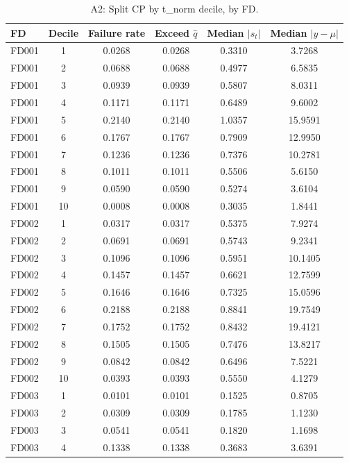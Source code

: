 \begin{table}[t]
\caption{A2: Split CP by t\_norm decile, by FD.}
\label{tab:A2-final}
\centering
\small
\begin{tabular}{lccccc}
\toprule
FD & Decile & Failure rate & Exceed $\hat q$ & Median $|s_t|$ & Median $|y-\mu|$ \\
\midrule
FD001 & 1 & 0.0268 & 0.0268 & 0.3310 & 3.7268 \\
FD001 & 2 & 0.0688 & 0.0688 & 0.4977 & 6.5835 \\
FD001 & 3 & 0.0939 & 0.0939 & 0.5807 & 8.0311 \\
FD001 & 4 & 0.1171 & 0.1171 & 0.6489 & 9.6002 \\
FD001 & 5 & 0.2140 & 0.2140 & 1.0357 & 15.9591 \\
FD001 & 6 & 0.1767 & 0.1767 & 0.7909 & 12.9950 \\
FD001 & 7 & 0.1236 & 0.1236 & 0.7376 & 10.2781 \\
FD001 & 8 & 0.1011 & 0.1011 & 0.5506 & 5.6150 \\
FD001 & 9 & 0.0590 & 0.0590 & 0.5274 & 3.6104 \\
FD001 & 10 & 0.0008 & 0.0008 & 0.3035 & 1.8441 \\
FD002 & 1 & 0.0317 & 0.0317 & 0.5375 & 7.9274 \\
FD002 & 2 & 0.0691 & 0.0691 & 0.5743 & 9.2341 \\
FD002 & 3 & 0.1096 & 0.1096 & 0.5951 & 10.1405 \\
FD002 & 4 & 0.1457 & 0.1457 & 0.6621 & 12.7599 \\
FD002 & 5 & 0.1646 & 0.1646 & 0.7325 & 15.0596 \\
FD002 & 6 & 0.2188 & 0.2188 & 0.8841 & 19.7549 \\
FD002 & 7 & 0.1752 & 0.1752 & 0.8432 & 19.4121 \\
FD002 & 8 & 0.1505 & 0.1505 & 0.7476 & 13.8217 \\
FD002 & 9 & 0.0842 & 0.0842 & 0.6496 & 7.5221 \\
FD002 & 10 & 0.0393 & 0.0393 & 0.5550 & 4.1279 \\
FD003 & 1 & 0.0101 & 0.0101 & 0.1525 & 0.8705 \\
FD003 & 2 & 0.0309 & 0.0309 & 0.1785 & 1.1230 \\
FD003 & 3 & 0.0541 & 0.0541 & 0.1820 & 1.1698 \\
FD003 & 4 & 0.1338 & 0.1338 & 0.3683 & 3.6391 \\

\end{tabular}
\end{table}
